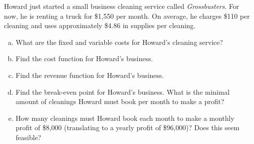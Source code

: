 \documentclass[11pt,letterpaper]{article}
\begin{document}
\newpage



 Howard just started a small business cleaning service called \textit{Grossbusters}. For now, he is renting a truck for \$1,550 per month. On average, he charges \$110 per cleaning and uses approximately \$4.86 in supplies per cleaning. 
	\begin{enumerate}[(a)]
	\item What are the fixed and variable costs for Howard's cleaning service?
	\item Find the cost function for Howard's business.
	\item Find the revenue function for Howard's business.
	\item Find the break-even point for Howard's business. What is the minimal amount of cleanings Howard must book per month to make a profit?
	\item How many cleanings must Howard book each month to make a monthly profit of \$8,000 (translating to a yearly profit of \$96,000)? Does this seem feasible? 
	\end{enumerate} 
\end{document}
